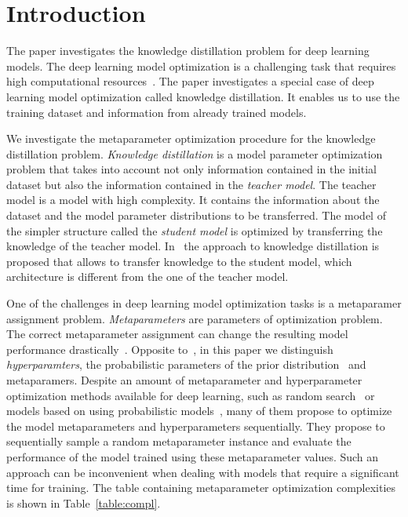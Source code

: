 \documentclass[runningheads]{llncs}
\begin{document}
\section{Introduction}
The paper investigates the knowledge distillation problem for deep learning models. The deep learning model optimization is a challenging task that requires high computational resources~\cite{rasley2020deepspeed}. The paper investigates a special case of deep learning model optimization called knowledge distillation. It enables us to use the training dataset and information from already trained models.

We investigate the metaparameter optimization procedure for the knowledge distillation problem. \textit{Knowledge distillation} \cite{journals/corr/HintonVD15} is a model parameter optimization problem that takes into account not only information contained in the initial dataset but also the information contained in the \textit{teacher model}. The teacher model is a model with high complexity. It contains the information about the dataset and the model parameter distributions to be transferred. The model of the simpler structure called the \textit{student model} is optimized by transferring the knowledge of the teacher model. In~\cite{conf/cvpr/PassalisTT20} the approach to knowledge distillation is proposed that allows to transfer knowledge to the student model, which architecture is different from the one of the teacher model.

One of the challenges in deep learning model optimization tasks is a metaparamer assignment problem.  \textit{Metaparameters} are parameters of optimization problem. The correct metaparameter assignment can change the resulting model performance drastically~\cite{journals/corr/Pedregosa16}. Opposite to~\cite{journals/corr/Pedregosa16,journals/corr/MaclaurinDA15}, in this paper we distinguish \textit{hyperparamters}, the probabilistic parameters of the prior distribution~\cite{bishop2006pattern} and metaparamers. Despite an amount of metaparameter and hyperparameter optimization methods available for deep learning, such as random search~\cite{bergstra2012random} or models based on using probabilistic models~\cite{bergstra2013making}, many of them propose to optimize the model metaparameters and hyperparameters sequentially. They propose to sequentially sample a random metaparameter instance and evaluate the performance of  the model trained using these metaparameter values. Such an approach can be inconvenient when dealing with models that require a significant time for training. The table containing metaparameter optimization complexities is shown in Table~\ref{table:compl}.
\end{document}
